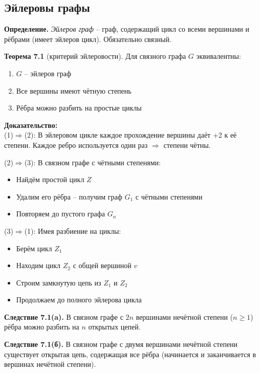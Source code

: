 \subsection{Эйлеровы графы}

\noindent\textbf{Определение.} \textit{Эйлеров граф} -- граф, содержащий цикл со всеми вершинами и рёбрами (имеет эйлеров цикл). Обязательно связный.

\noindent\textbf{Теорема 7.1} (критерий эйлеровости). Для связного графа $G$ эквивалентны:
\begin{enumerate}[noitemsep,topsep=0pt]
\item $G$ -- эйлеров граф
\item Все вершины имеют чётную степень
\item Рёбра можно разбить на простые циклы
\end{enumerate}

\noindent\textbf{Доказательство:}\\
(1)$\Rightarrow$(2): В эйлеровом цикле каждое прохождение вершины даёт +2 к её степени. Каждое ребро используется один раз $\Rightarrow$ степени чётны.

\noindent(2)$\Rightarrow$(3): В связном графе с чётными степенями:
\begin{itemize}[noitemsep]
\item Найдём простой цикл $Z$
\item Удалим его рёбра -- получим граф $G_1$ с чётными степенями
\item Повторяем до пустого графа $G_n$
\end{itemize}

\noindent(3)$\Rightarrow$(1): Имея разбиение на циклы:
\begin{itemize}[noitemsep]
\item Берём цикл $Z_1$
\item Находим цикл $Z_2$ с общей вершиной $v$
\item Строим замкнутую цепь из $Z_1$ и $Z_2$
\item Продолжаем до полного эйлерова цикла
\end{itemize}

\noindent\textbf{Следствие 7.1(a).} В связном графе с $2n$ вершинами нечётной степени ($n \geq 1$) рёбра можно разбить на $n$ открытых цепей.

\noindent\textbf{Следствие 7.1(б).} В связном графе с двумя вершинами нечётной степени существует открытая цепь, содержащая все рёбра (начинается и заканчивается в вершинах нечётной степени).
